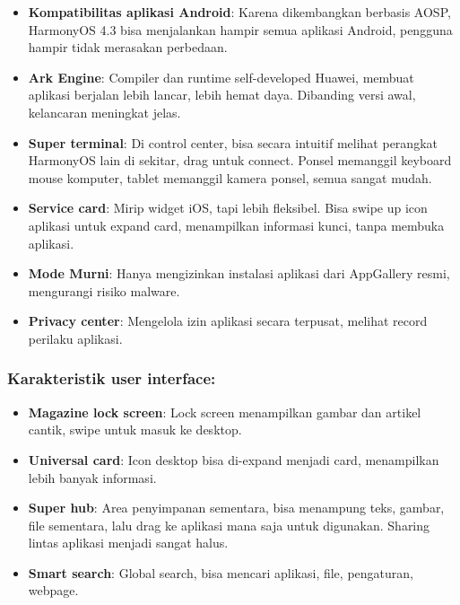 \begin{itemize}
  \item \textbf{Kompatibilitas aplikasi Android}: Karena dikembangkan berbasis AOSP, HarmonyOS 4.3 bisa menjalankan hampir semua aplikasi Android, pengguna hampir tidak merasakan perbedaan.
  \item \textbf{Ark Engine}: Compiler dan runtime self-developed Huawei, membuat aplikasi berjalan lebih lancar, lebih hemat daya. Dibanding versi awal, kelancaran meningkat jelas.
  \item \textbf{Super terminal}: Di control center, bisa secara intuitif melihat perangkat HarmonyOS lain di sekitar, drag untuk connect. Ponsel memanggil keyboard mouse komputer, tablet memanggil kamera ponsel, semua sangat mudah.
  \item \textbf{Service card}: Mirip widget iOS, tapi lebih fleksibel. Bisa swipe up icon aplikasi untuk expand card, menampilkan informasi kunci, tanpa membuka aplikasi.
  \item \textbf{Mode Murni}: Hanya mengizinkan instalasi aplikasi dari AppGallery resmi, mengurangi risiko malware.
  \item \textbf{Privacy center}: Mengelola izin aplikasi secara terpusat, melihat record perilaku aplikasi.
\end{itemize}

\subsubsection*{Karakteristik user interface:}

\begin{itemize}
  \item \textbf{Magazine lock screen}: Lock screen menampilkan gambar dan artikel cantik, swipe untuk masuk ke desktop.
  \item \textbf{Universal card}: Icon desktop bisa di-expand menjadi card, menampilkan lebih banyak informasi.
  \item \textbf{Super hub}: Area penyimpanan sementara, bisa menampung teks, gambar, file sementara, lalu drag ke aplikasi mana saja untuk digunakan. Sharing lintas aplikasi menjadi sangat halus.
  \item \textbf{Smart search}: Global search, bisa mencari aplikasi, file, pengaturan, webpage.
\end{itemize}



